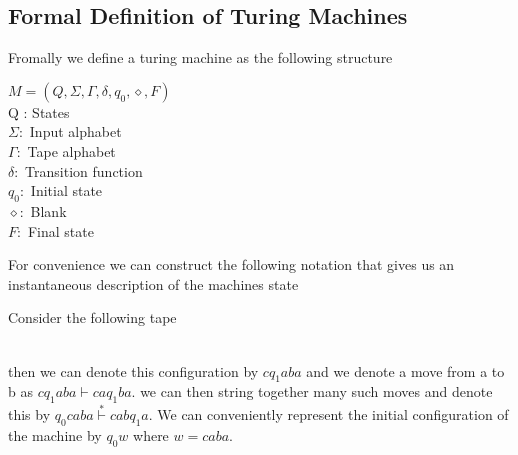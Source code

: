 \documentclass[11pt]{exam}
\begin{document}
\subsection{Formal Definition of Turing Machines}
Fromally we define a turing machine as the following structure
\begin{center}
$M = (Q,\Sigma, \Gamma, \delta, q_0, \diamond, F)$\\
Q : States\\
$\Sigma :$ Input alphabet\\
$\Gamma :$ Tape alphabet\\
$\delta :$ Transition function\\
$q_0 :$ Initial state\\
$\diamond :$ Blank\\
$F :$ Final state\\
\end{center}

For convenience we can construct the following notation that gives us an instantaneous description of the machines state
\begin{center}
Consider the following tape
\\
then we can denote this configuration by $cq_1aba$ and we denote a move from a to b as
$cq_1aba \vdash caq_1ba$. we can then string together many such moves and denote this by
$q_0caba \stackrel{*}{\vdash} cabq_1a$. We can conveniently represent the initial configuration of the machine
by $q_0w$ where $w = caba$.
\end{center}
\end{document}
